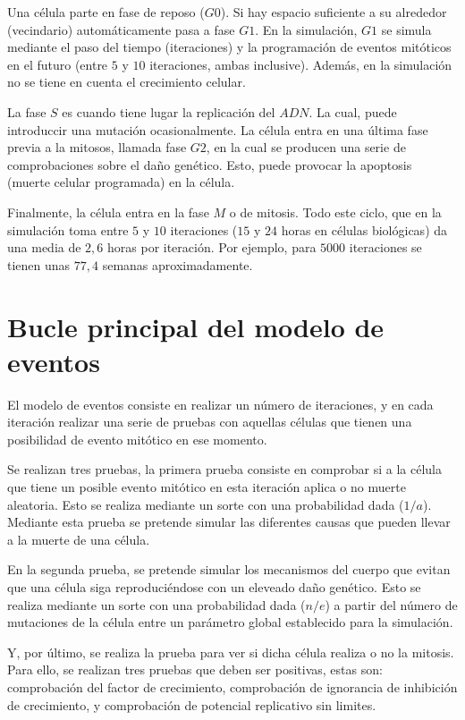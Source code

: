 Una célula parte en fase de reposo ($G0$). Si hay espacio suficiente a su alrededor (vecindario) automáticamente pasa
a fase $G1$. En la simulación, $G1$ se simula mediante el paso del tiempo (iteraciones) y la programación de
eventos mitóticos en el futuro (entre $5$ y $10$ iteraciones, ambas inclusive). Además, en la simulación no se
tiene en cuenta el crecimiento celular.

La fase $S$ es cuando tiene lugar la replicación del $ADN$. La cual, puede introduccir una mutación ocasionalmente.
La célula entra en una última fase previa a la mitosos, llamada fase $G2$, en la cual se producen una serie
de comprobaciones sobre el daño genético. Esto, puede provocar la apoptosis (muerte celular programada) en la célula.

Finalmente, la célula entra en la fase $M$ o de mitosis. Todo este ciclo, que en la simulación toma entre $5$ y $10$ iteraciones
($15$ y $24$ horas en células biológicas) da una media de $2,6$ horas por iteración. Por ejemplo, para $5000$ iteraciones se tienen
unas $77,4$ semanas aproximadamente.

\section{Bucle principal del modelo de eventos}

El modelo de eventos consiste en realizar un número de iteraciones, y en cada iteración realizar
una serie de pruebas con aquellas células que tienen una posibilidad de evento mitótico en ese
momento.

Se realizan tres pruebas, la primera prueba consiste en comprobar si a la célula que tiene
un posible evento mitótico en esta iteración aplica o no muerte aleatoria. Esto se realiza mediante un
sorte con una probabilidad dada ($1/a$). Mediante esta prueba se pretende simular las diferentes
causas que pueden llevar a la muerte de una célula.

En la segunda prueba, se pretende simular los mecanismos del cuerpo que evitan que una célula
siga reproduciéndose con un eleveado daño genético. Esto se realiza mediante un sorte con una probabilidad
dada ($n/e$) a partir del número de mutaciones de la célula entre un parámetro global establecido para
la simulación.

Y, por último, se realiza la prueba para ver si dicha célula realiza o no la mitosis.
Para ello, se realizan tres pruebas que deben ser positivas, estas son: comprobación del factor de crecimiento,
comprobación de ignorancia de inhibición de crecimiento, y comprobación de potencial replicativo sin limites.

